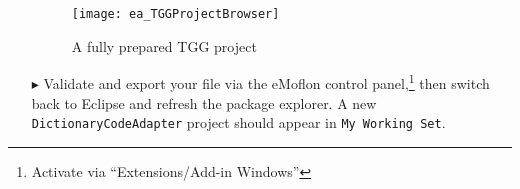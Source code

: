 \begin{itemize}
\vspace{0.5cm}

\begin{figure}[htpb]
\begin{center}
  \texttt{[image: ea\_TGGProjectBrowser]}
  \caption{A fully prepared TGG project}
  \label{ea:TGGProjBrow}
\end{center}
\end{figure}

\item[$\blacktriangleright$] Validate and export your file via the eMoflon control panel,\footnote{Activate via ``Extensions/Add-in Windows''} then switch
back to Eclipse and refresh the package explorer. A new \texttt{Dict\-ion\-ary\-Code\-Adap\-ter} project should appear in \texttt{My Working Set}.

\end{itemize}
